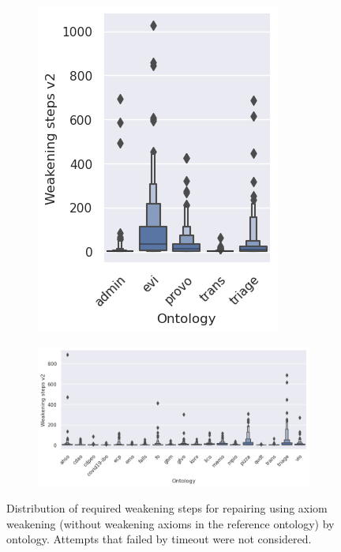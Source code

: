 \begin{figure}[ht]
  \centering
  \begin{subfigure}[T]{0.25\textwidth}
    \includegraphics[width=\textwidth]{resources/steps-enhance-ontology-violin-1.png}
  \end{subfigure}
  \begin{subfigure}[T]{0.715\textwidth}
    \includegraphics[width=\textwidth]{resources/steps-enhance-ontology-violin-2.png}
  \end{subfigure}
  \caption{Distribution of required weakening steps for repairing using axiom weakening (without weakening axioms in the reference ontology) by ontology. Attempts that failed by timeout were not considered.}
\end{figure}

